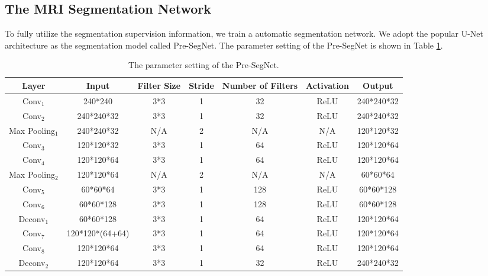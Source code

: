 \documentclass[runningheads]{llncs}
\begin{document}
\subsection{The MRI Segmentation Network}
\label{TheMRISeg}

To fully utilize the segmentation supervision information, we train a automatic segmentation network. We adopt the popular U-Net architecture as the segmentation model called Pre-SegNet. The parameter setting of the Pre-SegNet is shown in Table \ref{SegNet}.
\begin{table}[]
\centering
\scriptsize
\caption{The parameter setting of the Pre-SegNet.}
\label{SegNet}
\begin{tabular}{|c|c|c|c|c|c|c|}
\hline
Layer        & Input       & Filter Size & Stride & Number of Filters & Activation & Output          \\ \hline
Conv$_1$        & 240*240     & 3*3         & 1      & 32                & ReLU       & 240*240*32      \\ \hline
Conv$_2$       & 240*240*32  & 3*3         & 1      & 32                & ReLU       & 240*240*32      \\ \hline
Max Pooling$_1$ & 240*240*32  & N/A         & 2      & N/A               & N/A        & 120*120*32      \\ \hline
Conv$_3$        & 120*120*32  & 3*3         & 1      & 64                & ReLU       & 120*120*64      \\ \hline
Conv$_4$        & 120*120*64  & 3*3         & 1      & 64                 & ReLU       & 120*120*64      \\ \hline
Max Pooling$_2$ & 120*120*64  & N/A         & 2      & N/A               & N/A        & 60*60*64        \\ \hline
Conv$_5$        & 60*60*64    & 3*3         & 1      & 128               & ReLU       & 60*60*128       \\ \hline
Conv$_6$        & 60*60*128   & 3*3         & 1      & 128                & ReLU       & 60*60*128        \\ \hline
Deconv$_1$      & 60*60*128    & 3*3         & 1      & 64                & ReLU       & 120*120*64 \\ \hline
Conv$_7$        & 120*120*(64+64) & 3*3         & 1      & 64                & ReLU       & 120*120*64      \\ \hline
Conv$_8$        & 120*120*64  & 3*3         & 1      & 64                & ReLU       & 120*120*64      \\ \hline
Deconv$_2$      & 120*120*64  & 3*3         & 1      & 32                & ReLU       & 240*240*32 \\ \hline

\end{tabular}
\end{table}
\end{document}
